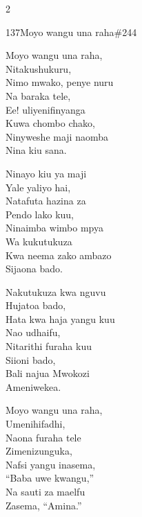 \begin{multicols}{2}
\begin{hymn}{137}{Moyo wangu una raha}{\#244}
\begin{stanza}
Moyo wangu una raha,\\
Nitakushukuru,\\
Nimo mwako, penye nuru\\
Na baraka tele,\\
Ee! uliyenifinyanga\\
Kuwa chombo chako,\\
Ninyweshe maji naomba\\
Nina kiu sana.
\end{stanza}
\begin{stanza}
Ninayo kiu ya maji\\
Yale yaliyo hai,\\
Natafuta hazina za\\
Pendo lako kuu,\\
Ninaimba wimbo mpya\\
Wa kukutukuza\\
Kwa neema zako ambazo\\
Sijaona bado.
\end{stanza}
\begin{stanza}
Nakutukuza kwa nguvu\\
Hujatoa bado,\\
Hata kwa haja yangu kuu\\
Nao udhaifu,\\
Nitarithi furaha kuu\\
Siioni bado,\\
Bali najua Mwokozi\\
Ameniwekea.
\end{stanza}
\begin{stanza}
Moyo wangu una raha,\\
Umenihifadhi,\\
Naona furaha tele\\
Zimenizunguka,\\
Nafsi yangu inasema,\\
``Baba uwe kwangu,''\\
Na sauti za maelfu\\
Zasema, ``Amina.''
\end{stanza}
\end{hymn}


\end{multicols}
